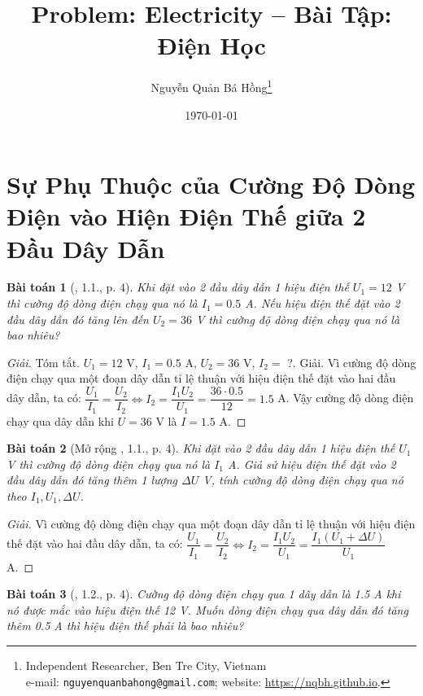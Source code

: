 \documentclass{article}
\title{Problem: Electricity -- Bài Tập: Điện Học}
\author{Nguyễn Quản Bá Hồng\footnote{Independent Researcher, Ben Tre City, Vietnam\\e-mail: \texttt{nguyenquanbahong@gmail.com}; website: \url{https://nqbh.github.io}.}}
\date{\today}
\newtheorem{baitoan}{Bài toán}
\begin{document}
\maketitle
\begin{abstract}
	
\end{abstract}
\tableofcontents
\newpage


\section{Sự Phụ Thuộc của Cường Độ Dòng Điện vào Hiện Điện Thế giữa 2 Đầu Dây Dẫn}

\begin{baitoan}[\cite{SBT_Vat_Ly_9}, 1.1., p. 4]
	Khi đặt vào 2 đầu dây dẫn 1 hiệu điện thế $U_1 = 12$ \emph{V} thì cường độ dòng điện chạy qua nó là $I_1 = 0.5$ \emph{A}. Nếu hiệu điện thế đặt vào 2 đầu dây dẫn đó tăng lên đến $U_2 = 36$ \emph{V} thì cường độ dòng điện chạy qua nó là bao nhiêu?
\end{baitoan}

\begin{proof}[Giải]
	\textsf{Tóm tắt.} $U_1 = 12$ V, $I_1 = 0.5$ A, $U_2 = 36$ V, $I_2 =$ ?. \textsf{Giải.} Vì cường độ dòng điện chạy qua một đoạn dây dẫn tỉ lệ thuận với hiệu điện thế đặt vào hai đầu dây dẫn, ta có: $\dfrac{U_1}{I_1} = \dfrac{U_2}{I_2}\Leftrightarrow I_2 = \dfrac{I_1U_2}{U_1} = \dfrac{36\cdot0.5}{12} = 1.5$ A. Vậy cường độ dòng điện chạy qua dây dẫn khi $U = 36$ V là $I = 1.5$ A.
\end{proof}

\begin{baitoan}[Mở rộng \cite{SBT_Vat_Ly_9}, 1.1., p. 4]
	Khi đặt vào 2 đầu dây dẫn 1 hiệu điện thế $U_1$ \emph{V} thì cường độ dòng điện chạy qua nó là $I_1$ \emph{A}. Giả sử hiệu điện thế đặt vào 2 đầu dây dẫn đó tăng thêm 1 lượng $\Delta U$ \emph{V}, tính cường độ dòng điện chạy qua nó theo $I_1,U_1,\Delta U$.
\end{baitoan}

\begin{proof}[Giải]
	Vì cường độ dòng điện chạy qua một đoạn dây dẫn tỉ lệ thuận với hiệu điện thế đặt vào hai đầu dây dẫn, ta có: $\dfrac{U_1}{I_1} = \dfrac{U_2}{I_2}\Leftrightarrow I_2 = \dfrac{I_1U_2}{U_1} = \dfrac{I_1(U_1 + \Delta U)}{U_1}$ A.
\end{proof}

\begin{baitoan}[\cite{SBT_Vat_Ly_9}, 1.2., p. 4]
	Cường độ dòng điện chạy qua 1 dây dẫn là \emph{1.5 A} khi nó được mắc vào hiệu điện thế \emph{12 V}. Muốn dòng điện chạy qua dây dẫn đó tăng thêm \emph{0.5 A} thì hiệu điện thế phải là bao nhiêu?
\end{baitoan}
\end{document}
